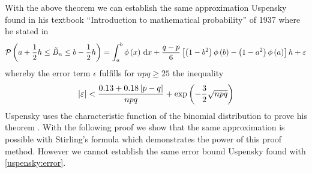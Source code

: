 \begin{remark}
  With the above theorem we can establish the same approximation Uspensky found in his textbook ``Introduction to mathematical probability'' of 1937 where he stated in \cite[p. 129]{uspensky}
  \begin{align}
    \mathcal P\left({a+\frac 12h \le \tilde B_{n} \le b-\frac 12h}\right) = \int_a^b \phi\left( {x} \right) \,\mathrm d{x} + \frac{q-p}6 \left[\left( {1-b^2} \right)\phi\left( {b} \right) - \left( {1-a^2} \right)\phi\left( {a} \right)\right] h + \varepsilon
  \end{align}
  whereby the error term $\epsilon$ fulfills for $npq \ge 25$ the inequality
  \begin{align} \label{uspensky:error}
    \left|{\varepsilon}\right| < \frac{0.13+0.18\left|{p-q}\right|}{npq} + \exp\left( {-\frac 32 \sqrt{npq}} \right)
  \end{align}
  Uspensky uses the characteristic function of the binomial distribution to prove his theorem \cite[pp. 119-129]{uspensky}. With the following proof we show that the same approximation is possible with Stirling's formula which demonstrates the power of this proof method. However we cannot establish the same error bound Uspensky found with \eqref{uspensky:error}.
\end{remark}

